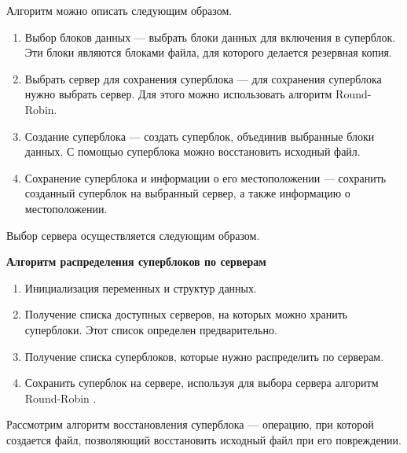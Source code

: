 
\newpage
\begin{flushleft}
Алгоритм можно описать следующим образом.
\end{flushleft}

\begin{enumerate}
\item Выбор блоков данных --- выбрать блоки данных для включения в суперблок. Эти блоки являются блоками файла, для которого делается резервная копия.  

\item Выбрать сервер для сохранения суперблока --- для сохранения суперблока нужно выбрать сервер. Для этого можно использовать алгоритм Round-Robin.  


\item Создание суперблока --- создать суперблок, объединив выбранные блоки данных. С помощью суперблока можно восстановить исходный файл.  

\item Сохранение суперблока и информации о его местоположении --- сохранить созданный суперблок на выбранный сервер, а также информацию о местоположении.  
\end{enumerate}

Выбор сервера осуществляется следующим образом. 

\begin{flushleft}
\textbf{Алгоритм распределения суперблоков по серверам}
\end{flushleft}

\begin{enumerate}
\item Инициализация переменных и структур данных.
\item Получение списка доступных серверов, на которых можно хранить суперблоки. Этот список определен предварительно.  
\item Получение списка суперблоков, которые нужно распределить по серверам.
\item Сохранить суперблок на сервере, используя для выбора сервера алгоритм Round-Robin \cite{round-robin}.  
\end{enumerate}

Рассмотрим алгоритм восстановления суперблока --- операцию, при которой создается файл, позволяющий восстановить исходный файл при его повреждении.  
\newpage
{}
\newpage

